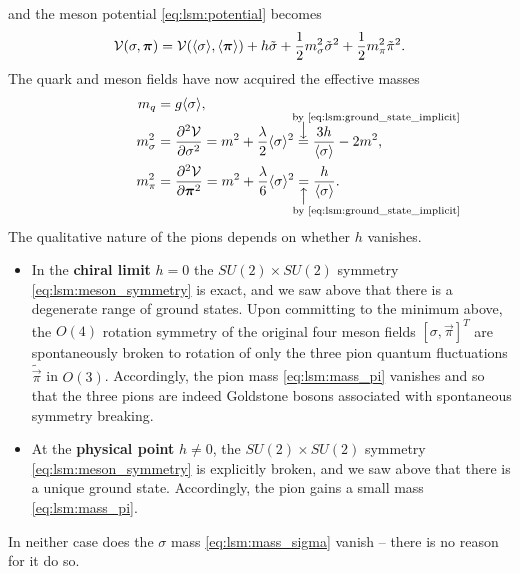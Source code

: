 and the meson potential \eqref{eq:lsm:potential} becomes
\begin{equation}
	\mathcal{V}(\sigma,{\bm{\pi}}) = \mathcal{V}(\langle \sigma \rangle,\langle {\bm{\pi}} \rangle) + h \tilde{\sigma} + \frac12 m_\sigma^2 \tilde{\sigma}^2 + \frac12 m_\pi^2 \tilde{\pi}^2.
\end{equation}
The quark and meson fields have now acquired the effective masses
\begin{subequations}
\begin{align}
	m_q &= g \avg{\sigma}, \label{eq:lsm:mass_quark} \\
	m_\sigma^2 &= \pdv[2]{\pot}{\sigma}\iffalse_{\substack{\sigma=\avg{\sigma}\\\vec{\pi}=\avg{\vec{\pi}}}}\fi    = m^2 + \frac{\lambda}{2} \avg{\sigma}^2 \equalexplabove{\smash{\text{by \eqref{eq:lsm:ground_state_implicit}}}} \frac{3h}{\avg{\sigma}} - 2 m^2 , \label{eq:lsm:mass_sigma} \\
	m_\pi^2    &= \pdv[2]{\pot}{\vec{\pi}}\iffalse_{\substack{\sigma=\avg{\sigma}\\\vec{\pi}=\avg{\vec{\pi}}}}\fi = m^2 + \frac{\lambda}{6} \avg{\sigma}^2 \equalexplbelow{\text{by \eqref{eq:lsm:ground_state_implicit}}} \frac{h}{\avg{\sigma}} . \label{eq:lsm:mass_pi}
\end{align}%
\label{eq:lsm:mass_sigmapi}%
\end{subequations}%
The qualitative nature of the pions depends on whether $h$ vanishes.
\begin{itemize}
\item In the \textbf{chiral limit} $h = 0$ the $SU(2) \times SU(2)$ symmetry \eqref{eq:lsm:meson_symmetry} is exact,
      and we saw above that there is a degenerate range of ground states.
      Upon committing to the minimum above, the $O(4)$ rotation symmetry of the original four meson fields $[\sigma,\vec\pi]^T$ are spontaneously broken
      to rotation of only the three pion quantum fluctuations $\tilde{\vec\pi}$ in $O(3)$.
      Accordingly, the pion mass \eqref{eq:lsm:mass_pi} vanishes and so that the three pions are indeed Goldstone bosons associated with spontaneous symmetry breaking.
\item At the \textbf{physical point} $h \neq 0$, the $SU(2) \times SU(2)$ symmetry \eqref{eq:lsm:meson_symmetry} is explicitly broken,
      and we saw above that there is a unique ground state.
      Accordingly, the pion gains a small mass \eqref{eq:lsm:mass_pi}.
\end{itemize}
\label{elaborate on mexican hat analogy, brim, tip/tilt, etc.}
In neither case does the $\sigma$ mass \eqref{eq:lsm:mass_sigma} vanish -- there is no reason for it do so.

